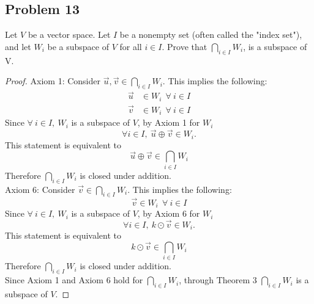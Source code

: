 \documentclass{article}
\begin{document}
\subsection*{Problem 13}
Let $V$ be a vector space. Let $I$ be a nonempty set (often called the "index set"), and let $W_i$ be a subspace of $V$ for all $i \in I$. Prove that $\displaystyle \bigcap_{i \in I} W_i$, is a subspace of V.
\begin{proof}
    Axiom 1: Consider $\vec{u}, \vec{v} \in \displaystyle \bigcap_{i \in I} W_i$. This implies the following:
    \begin{align*}
        \vec{u} & \in W_i~~\forall~i \in I \\
        \vec{v} & \in W_i~~\forall~i \in I
    \end{align*}
    Since $\forall~i \in I,~W_i$ is a subspace of $V$, by Axiom 1 for $W_i$
    \[
        \forall i \in I,~\vec{u} \oplus \vec{v} \in W_i.
    \]
    This statement is equivalent to
    \[
        \vec{u} \oplus \vec{v} \in \bigcap_{i \in I} W_i
    \]
    Therefore $\displaystyle \bigcap_{i \in I} W_i$ is closed under addition. \\
    Axiom 6: Consider $\vec{v} \in \displaystyle \bigcap_{i \in I} W_i$. This implies the following:
    \[
        \vec{v} \in W_i~~\forall~i \in I
    \]
    Since $\forall~i \in I,~W_i$ is a subspace of $V$, by Axiom 6 for $W_i$
    \[
        \forall i \in I,~k \odot \vec{v} \in W_i.
    \]
    This statement is equivalent to
    \[
        k \odot \vec{v} \in \bigcap_{i \in I} W_i
    \]
    Therefore $\displaystyle \bigcap_{i \in I} W_i$ is closed under addition. \\
    Since Axiom 1 and Axiom 6 hold for $\displaystyle \bigcap_{i \in I} W_i$, through Theorem 3 $\displaystyle \bigcap_{i \in I} W_i$ is a subspace of $V$.
\end{proof}
\end{document}
